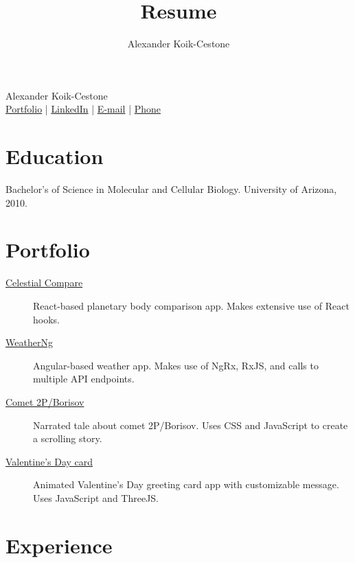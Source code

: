 \documentclass{article}
\author{Alexander Koik-Cestone}
\title{Resume}
\begin{document}
\begin{center}
{\huge Alexander Koik-Cestone\vspace{0.3cm}} \\
\href{https://sirkoik.github.io#portfolio}{Portfolio} |
\href{https://www.linkedin.com/in/alexander-koik-cestone-89304556/}{LinkedIn} |
\href{mailto:akoikcestone@gmail.com}{E-mail} |
\href{tel:614-674-0668}{Phone} \\
\end{center}

\section{Education}
Bachelor's of Science in Molecular and Cellular Biology. University of Arizona, 2010.

\section{Portfolio}

\begin{description}
  \item[\href{https://sirkoik.github.io/Celestial-Compare}{Celestial Compare}] React-based planetary body comparison app. Makes extensive use of React hooks.
  \item[\href{https://sirkoik.github.io/WeatherNg}{WeatherNg}] Angular-based weather app. Makes use of NgRx, RxJS, and calls to multiple API endpoints. 
  \item[\href{https://sirkoik.github.io/BorisovXmas}{Comet 2P/Borisov}] Narrated tale about comet 2P/Borisov. Uses CSS and JavaScript to create a scrolling story. 
  \item[\href{https://sirkoik.github.io/February}{Valentine's Day card}] Animated Valentine's Day greeting card app with customizable message. Uses JavaScript and ThreeJS.
\end{description}

\section{Experience}
\end{document}
